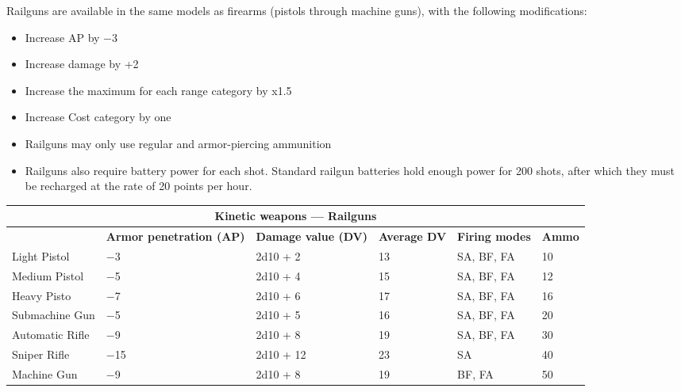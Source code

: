 Railguns are available in the same models as firearms (pistols through machine guns), with the following modifications: 

\begin{itemize} \item Increase AP by $-$3 \item Increase damage by +2 \item Increase the maximum for each range category by x1.5 \item Increase Cost category by one \item Railguns may only use regular and armor-piercing ammunition \item Railguns also require battery power for each shot. Standard railgun batteries hold enough power for 200 shots, after which they must be recharged at the rate of 20 points per hour. \end{itemize} 

\begin{table} \begin{tabularx}{\textwidth}{|l|X|X|X|X|l|} \hline

\multicolumn{6}{|c|}{\textbf{Kinetic weapons --- Railguns}} \\ \hline

&\textbf{Armor penetration (AP)}	&\textbf{Damage value (DV)}	&\textbf{Average DV}	&\textbf{Firing modes}	&\textbf{Ammo} \\ \hline

Light Pistol	&$-$3	&2d10 + 2	&13	&SA, BF, FA	&10 \\ \hline

Medium Pistol	&$-$5	&2d10 + 4	&15	&SA, BF, FA	&12 \\ \hline

Heavy Pisto	&$-$7	&2d10 + 6	&17	&SA, BF, FA	&16 \\ \hline

Submachine Gun &$-$5	&2d10 + 5	&16	&SA, BF, FA	&20 \\ \hline

Automatic Rifle	&$-$9	&2d10 + 8	&19	&SA, BF, FA	&30 \\ \hline

Sniper Rifle	&$-$15	&2d10 + 12	&23	&SA	&40 \\ \hline

Machine Gun	&$-$9	&2d10 + 8	&19	&BF, FA	&50 \\ \hline

\end{tabularx} \label{tab:kinetic-railguns} \end{table} 


